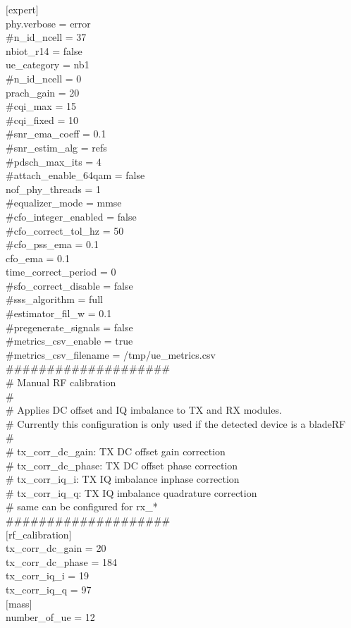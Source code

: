 $[$expert$]$  \\
phy.verbose          = error  \\
\#n\_id\_ncell           = 37  \\
nbiot\_r14            = false  \\
ue\_category          = nb1  \\
\#n\_id\_ncell           = 0  \\
prach\_gain          = 20  \\
\#cqi\_max             = 15  \\
\#cqi\_fixed           = 10  \\
\#snr\_ema\_coeff       = 0.1  \\
\#snr\_estim\_alg       = refs  \\
\#pdsch\_max\_its       = 4  \\
\#attach\_enable\_64qam = false\\  
nof\_phy\_threads     = 1  \\
\#equalizer\_mode      = mmse\\  
\#cfo\_integer\_enabled = false\\  
\#cfo\_correct\_tol\_hz  = 50  \\
\#cfo\_pss\_ema	     = 0.1  \\
cfo\_ema		     = 0.1  \\
time\_correct\_period = 0  \\
\#sfo\_correct\_disable = false \\ 
\#sss\_algorithm       = full  \\
\#estimator\_fil\_w     = 0.1  \\
\#pregenerate\_signals = false  \\
\#metrics\_csv\_enable = true  \\
\#metrics\_csv\_filename = /tmp/ue\_metrics.csv  \\
  
\#\#\#\#\#\#\#\#\#\#\#\#\#\#\#\#\#\#\#\#  \\
\# Manual RF calibration  \\
\#  \\
\# Applies DC offset and IQ imbalance to TX and RX modules.   \\
\# Currently this configuration is only used if the detected device is a bladeRF  \\
\#  \\
\# tx\_corr\_dc\_gain: TX DC offset gain correction  \\
\# tx\_corr\_dc\_phase: TX DC offset phase correction  \\
\# tx\_corr\_iq\_i: TX IQ imbalance inphase correction  \\
\# tx\_corr\_iq\_q: TX IQ imbalance quadrature correction \\ 
\# same can be configured for rx\_*  \\
\#\#\#\#\#\#\#\#\#\#\#\#\#\#\#\#\#\#\#\# \\  

$[$rf\_calibration$]$  \\
tx\_corr\_dc\_gain = 20  \\
tx\_corr\_dc\_phase = 184  \\
tx\_corr\_iq\_i = 19  \\
tx\_corr\_iq\_q = 97  \\
  
$[$mass$]$  \\
number\_of\_ue = 12 \\